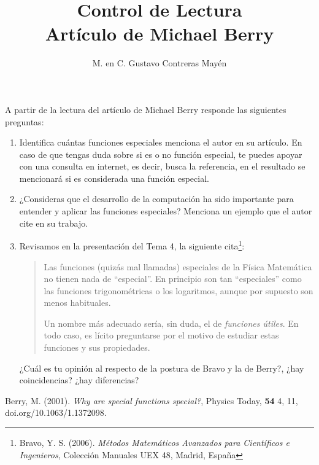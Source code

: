 
\title{Control de Lectura \\ \large {Artículo de Michael Berry}\vspace{-3ex}}

\author{M. en C. Gustavo Contreras Mayén}
\date{ }


\maketitle
\fontsize{14}{14}\selectfont

A partir de la lectura del artículo de Michael Berry \cite{Berry} responde las siguientes preguntas:

\begin{enumerate}[label=\alph*)]
\item Identifica cuántas funciones especiales menciona el autor en su artículo. En caso de que tengas duda sobre si es o no función especial, te puedes apoyar con una consulta en internet, es decir, busca la referencia, en el resultado se mencionará si es considerada una función especial.
\item ¿Consideras que el desarrollo de la computación ha sido importante para entender y aplicar las funciones especiales? Menciona un ejemplo que el autor cite en su trabajo.
\item Revisamos en la presentación del Tema 4, la siguiente cita\footnote{Bravo, Y. S. (2006). \textit{Métodos Matemáticos Avanzados para Científicos e Ingenieros}, Colección Manuales UEX 48, Madrid, España}:
\begin{quote}
Las funciones (quizás mal llamadas) especiales de la Física Matemática no tienen nada de \enquote{especial}. En principio son tan \enquote{especiales} como las funciones trigonométricas o los logaritmos, aunque por supuesto son menos habituales.
\par
Un nombre más adecuado sería, sin duda, el de \emph{funciones útiles}. En todo caso, es lícito preguntarse por el motivo de estudiar estas funciones y sus propiedades.
\end{quote}

¿Cuál es tu opinión al respecto de la postura de Bravo y la de Berry?, ¿hay coincidencias? ¿hay diferencias?
\end{enumerate}


\begin{thebibliography}{X}
 Berry, M. (2001). \textit{Why are special functions special?}, Physics Today, \textbf{54} 4, 11, doi.org/10.1063/1.1372098.
\end{thebibliography}



